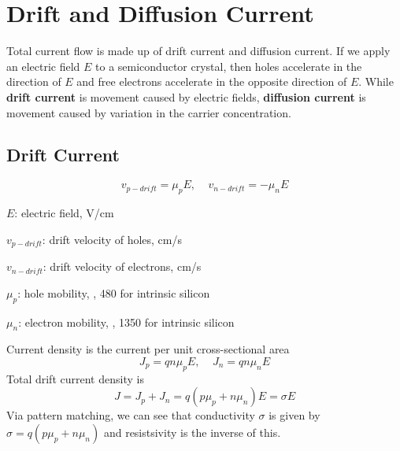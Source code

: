 \chapter{Drift and Diffusion Current}
Total current flow is made up of drift current and diffusion current. If we apply an electric field $E$ to a semiconductor crystal, then holes accelerate in the direction of $E$ and free electrons accelerate in the opposite direction of $E$. While \textbf{drift current} is movement caused by electric fields, \textbf{diffusion current} is movement caused by variation in the carrier concentration. 

\section{Drift Current}
    \[v_{p-drift} = \mu_p E, ~~~~~ v_{n-drift} = - \mu_n E\]

\begin{gline}
    \item $E$: electric field, V/cm
    \item $v_{p-drift}$: drift velocity of holes, cm/s
    \item $v_{n-drift}$: drift velocity of electrons, cm/s
    \item $\mu_p$: hole mobility, \unit{\mobility}, \qty{480}{\mobility} for intrinsic silicon
    \item $\mu_n$: electron mobility, \unit{\mobility}, \qty{1350}{\mobility} for intrinsic silicon
\end{gline}

Current density is the current per unit cross-sectional area
    \[J_p = qn\mu_p E, ~~~~~ J_n = q n \mu_n E\]
Total drift current density is
    \[J = J_p + J_n = q(p\mu_p + n\mu_n) E = \sigma E\]
Via pattern matching, we can see that conductivity $\sigma$ is given by $\sigma = q(p\mu_p + n\mu_n)$ and resistsivity is the inverse of this.

